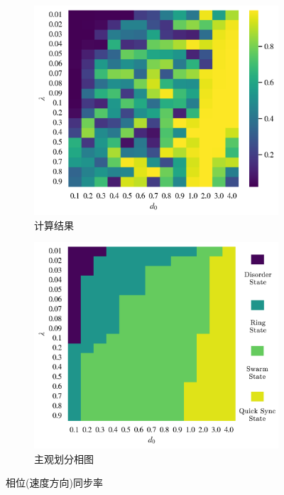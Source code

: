 \documentclass{article}
\begin{document}
\begin{figure}[H]
	\centering
	\begin{subfigure}[b]{0.49\textwidth}
		\includegraphics[width=\textwidth]{./figs/phaseSyncOp.png}
		\vspace{-1cm}
		\caption{计算结果}
	\end{subfigure}
	\begin{subfigure}[b]{0.49\textwidth}
		\includegraphics[width=\textwidth]{./figs/subjectiveOp.png}
		\vspace{-1cm}
		\caption{主观划分相图}
	\end{subfigure}
	\vspace{-0.5cm}
	\caption{相位(速度方向)同步率}
	\label{fig:fig234c.1}
\end{figure}
\end{document}
